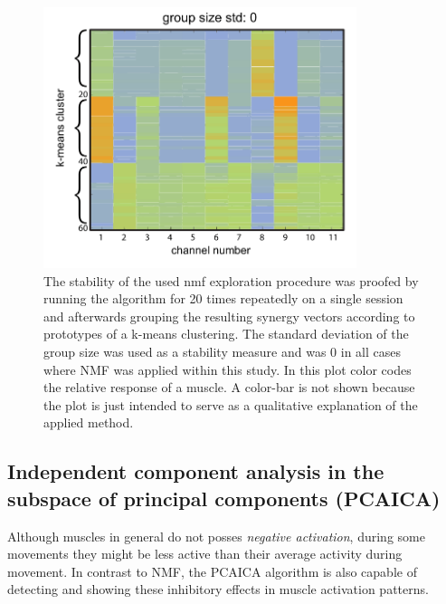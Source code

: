 \begin{figure}[ht]
	\centering
		\includegraphics[height=3in]{images/nmf_expl_stab3.pdf}
	\caption{The stability of the used nmf exploration procedure was proofed by running the algorithm for 20 times repeatedly on a single session and afterwards grouping the resulting synergy vectors according to prototypes of a k-means clustering. The standard deviation of the group size was used as a stability measure and was 0 in all cases where NMF was applied within this study. In this plot color codes the relative response of a muscle. A color-bar is not shown because the plot is just intended to serve as a qualitative explanation of the applied method.}
	\label{sg:fig:images_nmf_expl_stab3}
\end{figure}


\subsection{Independent component analysis in the subspace of principal components (PCAICA)} %
\label{sg:sub:pcaica}

Although muscles in general do not posses \emph{negative activation}, during some movements they might be less active than their average activity during movement. In contrast to NMF, the PCAICA algorithm is also capable of detecting and showing these inhibitory effects in muscle activation patterns. 

